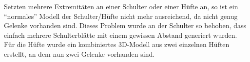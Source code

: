 
Setzten mehrere Extremitäten an einer Schulter oder einer Hüfte an, so ist ein "`normales"' Modell der Schulter/Hüfte nicht mehr ausreichend, da nicht genug Gelenke vorhanden sind. Dieses Problem wurde an der Schulter so behoben, dass einfach mehrere Schulterblätte mit einem gewissen Abstand generiert wurden. Für die Hüfte wurde ein kombiniertes 3D-Modell aus zwei einzelnen Hüften erstellt, an dem nun zwei Gelenke vorhanden sind.




